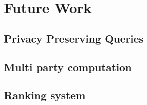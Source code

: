 \chapter{Future Work}
\label{future_work}

\section{Privacy Preserving Queries}
\label{future_work:ppq}

\section{Multi party computation}
\label{future_work:mpc}

\section{Ranking system}
\label{future_work:ranking_system}

